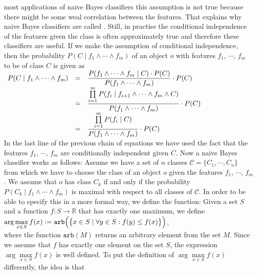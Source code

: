 most applications of naive Bayes classifiers this assumption is not true because there might be some weal
correlation between the features.  That explains why naive Bayes classifiers are called .  Still,
in practise the conditional independence of the features given 
the class is often approximately true and therefore these classifiers are useful.  If we make the
assumption of conditional independence, then the probability $P(C\;|\; f_1 \wedge \cdots \wedge f_m)$ of an
object $o$ with features $f_1$, $\cdots$, $f_m$ to be of class $C$ is given as
\\[0.2cm]
\hspace*{1.3cm}
$
\begin{array}[t]{lcll}
      P(C\;|\; f_1 \wedge \cdots \wedge f_m) 
& = & \displaystyle \frac{P(f_1 \wedge \cdots \wedge f_m \;|\; C) \cdot P(C)}{P(f_1 \wedge \cdots \wedge f_m)} \cdot P(C) \\[0.2cm]
& = & \displaystyle \frac{\prod\limits_{i=1}^m P(f_i \;|\; f_{i+1} \wedge \cdots \wedge f_m \wedge C)}{P(f_1 \wedge \cdots \wedge f_m)} \cdot P(C) \\[0.2cm]
& = & \displaystyle \frac{\prod\limits_{i=1}^m P(f_i \;|\; C)}{P(f_1 \wedge \cdots \wedge f_m)} \cdot P(C) 
\end{array}
$
\\[0.2cm]
In the last line of the previous chain of equations we have used the fact that the features $f_1$, $\cdots$,
$f_m$ are conditionally independent given $C$.  Now a naive Bayes classifier works as follows: 
Assume we have a set of $n$ classes $\mathcal{C} = \{ C_1, \cdots, C_n \}$ from which we have to choose the
class of an object $o$ given the features  $f_1$, $\cdots$, $f_m$.  We assume that $o$ has class $C_k$ if
and only if the probability $P(C_k\;|\; f_1 \wedge \cdots \wedge f_m)$ is maximal with respect to all classes
of $\mathcal{C}$.  In order to be able to specify this in a more formal
way, we define the \blue{$\arg\max$} function: Given a set $S$ and a function $f:S \rightarrow \mathbb{R}$ that has
exactly one maximum, we define
\\[0.2cm]
\hspace*{1.3cm}
$\arg\max\limits_{x \in S} f(x) := \texttt{arb}\Bigl(\bigl\{ x \in S \mid \forall y \in S: f(y) \leq f(x)\bigr\}\Bigr)$,
\\[0.2cm]
where the function $\texttt{arb}(M)$ returns an arbitrary element from the set $M$. 
Since we assume that $f$ has exactly one element on the set $S$, the expression 
$\arg\max\limits_{x \in S} f(x)$ is well defined.  To
put the definition of  $\arg\max\limits_{x \in S} f(x)$ differently, the idea is that
